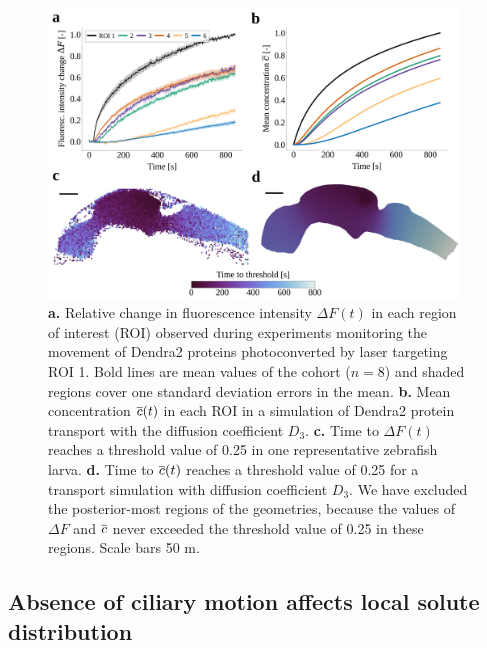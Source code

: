 \documentclass{WileyMSP-template}
\begin{document}
\begin{figure}[H]
    \centering
    \includegraphics[width=0.975\textwidth]{graphics/figure3_compare_experiments_and_simulations.png}
    \caption{
    \textbf{a.} Relative change in fluorescence intensity $\Delta F(t)$ 
    in each region of interest (ROI)
    observed during experiments monitoring
    the movement of Dendra2 proteins photoconverted by laser targeting ROI 1. 
    Bold lines are mean values of the cohort ($n=8$) and shaded regions cover
    one standard deviation errors in the mean.
    \textbf{b.} Mean concentration $\overline{c}(t)$ in each ROI in a
    simulation of Dendra2 protein transport with
    the diffusion coefficient $D_3$.
    \textbf{c.} Time to $\Delta F(t)$ reaches a threshold value of 0.25 in
    one representative zebrafish larva.
    \textbf{d.} Time to $\overline{c}(t)$ reaches a threshold value of 0.25 for
    a transport simulation with diffusion coefficient $D_3$.
    We have excluded the posterior-most regions of the geometries,
    because the values of $\Delta F$ and $\overline{c}$ never exceeded the threshold
    value of 0.25 in these regions. Scale bars 50 \textmu m.}
    \label{fig:fig3}
\end{figure}

\subsection{Absence of ciliary motion affects local solute distribution}
\end{document}
